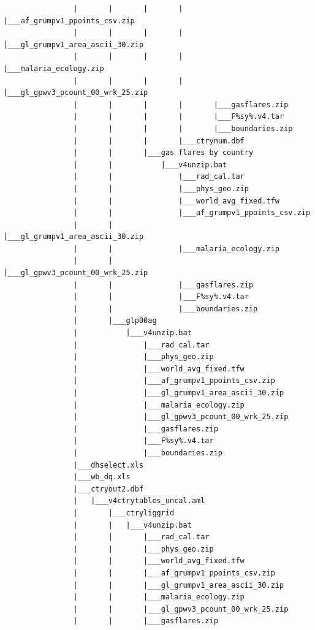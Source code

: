 \documentclass[]{book}
\begin{document}
\begin{verbatim}
                |       |       |       |       |___af_grumpv1_ppoints_csv.zip
                |       |       |       |       |___gl_grumpv1_area_ascii_30.zip
                |       |       |       |       |___malaria_ecology.zip
                |       |       |       |       |___gl_gpwv3_pcount_00_wrk_25.zip
                |       |       |       |       |___gasflares.zip
                |       |       |       |       |___F%sy%.v4.tar
                |       |       |       |       |___boundaries.zip
                |       |       |       |___ctrynum.dbf
                |       |       |___gas flares by country
                |       |           |___v4unzip.bat
                |       |               |___rad_cal.tar
                |       |               |___phys_geo.zip
                |       |               |___world_avg_fixed.tfw
                |       |               |___af_grumpv1_ppoints_csv.zip
                |       |               |___gl_grumpv1_area_ascii_30.zip
                |       |               |___malaria_ecology.zip
                |       |               |___gl_gpwv3_pcount_00_wrk_25.zip
                |       |               |___gasflares.zip
                |       |               |___F%sy%.v4.tar
                |       |               |___boundaries.zip
                |       |___glp00ag
                |           |___v4unzip.bat
                |               |___rad_cal.tar
                |               |___phys_geo.zip
                |               |___world_avg_fixed.tfw
                |               |___af_grumpv1_ppoints_csv.zip
                |               |___gl_grumpv1_area_ascii_30.zip
                |               |___malaria_ecology.zip
                |               |___gl_gpwv3_pcount_00_wrk_25.zip
                |               |___gasflares.zip
                |               |___F%sy%.v4.tar
                |               |___boundaries.zip
                |___dhselect.xls
                |___wb_dq.xls
                |___ctryout2.dbf
                |   |___v4ctrytables_uncal.aml
                |       |___ctryliggrid
                |       |   |___v4unzip.bat
                |       |       |___rad_cal.tar
                |       |       |___phys_geo.zip
                |       |       |___world_avg_fixed.tfw
                |       |       |___af_grumpv1_ppoints_csv.zip
                |       |       |___gl_grumpv1_area_ascii_30.zip
                |       |       |___malaria_ecology.zip
                |       |       |___gl_gpwv3_pcount_00_wrk_25.zip
                |       |       |___gasflares.zip

\end{verbatim}
\end{document}
